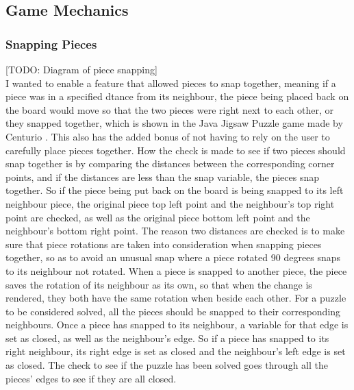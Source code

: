 \documentclass{article}
\begin{document}
\subsection{Game Mechanics}

\subsubsection{Snapping Pieces}
[TODO: Diagram of piece snapping]\\

I wanted to enable a feature that allowed pieces to snap together, meaning if a
piece was in a specified dtance from its neighbour, the piece being placed back
on the board would move so that the two pieces were right next to each other, or
they snapped together, which is shown in the Java Jigsaw Puzzle game made by
Centurio \cite{ref:SourceJigsaw}. This also has the added bonus of not having to
rely on the user to carefully place pieces together. How the check is made to
see if two pieces should snap together is by comparing the distances between the
corresponding corner points, and if the distances are less than the snap
variable, the pieces snap together. So if the piece being put back on the board
is being snapped to its left neighbour piece, the original piece top left point
and the neighbour's top right point are checked, as well as the original piece
bottom left point and the neighbour's bottom right point. The reason two
distances are checked is to make sure that piece rotations are taken into
consideration when snapping pieces together, so as to avoid an unusual snap
where a piece rotated 90 degrees snaps to its neighbour not rotated. When a
piece is snapped to another piece, the piece saves the rotation of its neighbour
as its own, so that when the change is rendered, they both have the same
rotation when beside each other. For a puzzle to be considered solved, all the
pieces should be snapped to their corresponding neighbours. Once a piece has
snapped to its neighbour, a variable for that edge is set as closed, as well as
the neighbour's edge. So if a piece has snapped to its right neighbour, its
right edge is set as closed and the neighbour's left edge is set as closed. The
check to see if the puzzle has been solved goes through all the pieces' edges to
see if they are all closed.

\end{document}
